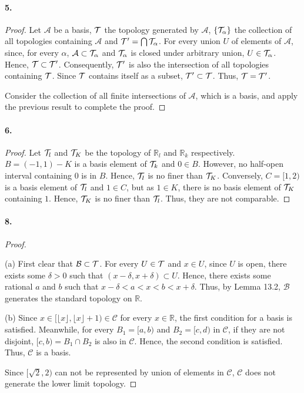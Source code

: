   \paragraph{5.}
  \begin{proof}
    Let $\mathcal{A}$ be a basis, $\mathcal{T}$ the topology generated by 
    $\mathcal{A}$, $\{\mathcal{T}_\alpha\}$ the collection of all topologies containing
    $\mathcal{A}$ and $\mathcal{T}^\prime=\bigcap\mathcal{T}_\alpha$. For every union $U$ of
    elements of $\mathcal{A}$, since, for every $\alpha$, $\mathcal{A}\subset
    \mathcal{T}_\alpha$ and $\mathcal{T}_\alpha$ is closed under arbitrary union, $U\in
    \mathcal{T}_\alpha$. Hence, $\mathcal{T}\subset\mathcal{T}^\prime$. Consequently, $\mathcal{T}^\prime$ is also the
    intersection of all topologies containing $\mathcal{T}$. Since $\mathcal{T}$ contains 
    itself as a subset, $\mathcal{T}^\prime\subset\mathcal{T}$. Thus, $\mathcal{T}=\mathcal{T}^\prime$.\par
    Consider the collection of all finite intersections of $\mathcal{A}$, which
    is a basis, and apply the previous result to complete the proof.
  \end{proof}
  
  \paragraph{6.}
  \begin{proof}
    Let $\mathcal{T}_l$ and $\mathcal{T}_K$ be the topology of $\mathbb{R}_l$ and $\mathbb{R}
    _k$ respectively. $B=(-1,1)-K$ is a basis element of $\mathcal{T}_k$ and $0\in B$.
    However, no half-open interval containing $0$ is in $B$. Hence, $\mathcal{T}_l$ is
    no finer than $\mathcal{T}_K$. Conversely, $C=[1,2)$ is a basis element of $\mathcal{T}_l$ 
    and $1\in C$, but as $1\in K$, there is no basis element of $\mathcal{T}_K$ 
    containing $1$. Hence, $\mathcal{T}_K$ is no finer than $\mathcal{T}_l$. Thus, they are not
    comparable.
  \end{proof}
  
  \paragraph{8.}
  \begin{proof}
    $\,$\par
    (a) First clear that $\mathcal{B}\subset\mathcal{T}$. For every $U\in\mathcal{T}$ and $x\in 
    U$, since $U$ is open, there exists some $\delta>0$ such that $(x-\delta,x+
    \delta)\subset U$. Hence, there exists some rational $a$ and $b$ such that
    $x-\delta<a<x<b<x+\delta$. Thus, by Lemma 13.2, $\mathcal{B}$ generates the 
    standard topology on $\mathbb{R}$.\par
    (b) Since $x\in[\lfloor x\rfloor,\lfloor x\rfloor+1)\in\mathcal{C}$ for 
    every $x\in\mathbb{R}$, the first condition for a basis is satisfied. 
    Meanwhile, for every $B_1=[a,b)$ and $B_2=[c,d)$ in $\mathcal{C}$, if they
    are not disjoint, $[c,b)=B_1\cap B_2$ is also in $\mathcal{C}$. Hence, the
    second condition is satisfied. Thus, $\mathcal{C}$ is a basis.\par
    Since $[\sqrt{2},2)$ can not be represented by union of elements in 
    $\mathcal{C}$, $\mathcal{C}$ does not generate the lower limit topology.
  \end{proof}

